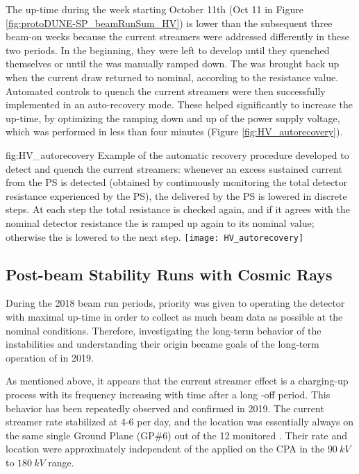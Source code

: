 The up-time during the week starting October 11th (Oct 11 in Figure \ref{fig:protoDUNE-SP_beamRunSum_HV}) is lower than the subsequent three beam-on weeks because the current streamers were addressed differently in these two periods. In the beginning, they were left to develop until they quenched themselves or until the  was manually ramped down. The  was brought back up when the current draw returned to nominal, according to the  resistance value. Automated controls to quench the current streamers were then successfully implemented in an auto-recovery mode. These helped significantly to increase the up-time, by optimizing the ramping down and up of the  power supply voltage, which was performed in less than four minutes (Figure \ref{fig:HV_autorecovery}).

\begin{dunefigure}
{fig:HV_autorecovery}
{Example of the  automatic recovery procedure developed to detect and quench the current streamers: whenever an excess sustained current from the  PS is detected (obtained by continuously monitoring the total detector resistance experienced by the PS), the  delivered by the PS is lowered in discrete steps. At each step the total resistance is checked again, and if it agrees with the nominal detector resistance the  is ramped up again to its nominal value; otherwise the  is lowered to the next step.}
\texttt{[image: HV\_autorecovery]}
\end{dunefigure}



\subsection{Post-beam Stability Runs with Cosmic Rays}
\label{sec:fdsp-hv-long-term-operation}

During the 2018 beam run periods, priority was given to operating the  detector with maximal up-time in order to collect as much beam data as possible at the nominal  conditions. Therefore, investigating the long-term behavior of the  instabilities and understanding their origin became goals of the long-term operation of  in 2019.

As mentioned above, it appears that the current streamer effect is a charging-up process with its frequency increasing with time after a long -off period. This behavior has been repeatedly observed and confirmed in 2019. The current streamer rate stabilized at 4-6 per day, and the location was essentially always on the same single Ground Plane (GP\#6) out of the 12 monitored . Their rate and location were approximately independent of the  applied on the CPA in the $\SI{90}{kV}$ to $\SI{180}{kV}$ range.

